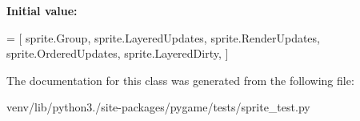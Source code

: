 {\bfseries Initial value\+:}
\begin{DoxyCode}
=  [ sprite.Group,
               sprite.LayeredUpdates,
               sprite.RenderUpdates,
               sprite.OrderedUpdates,
               sprite.LayeredDirty, ]
\end{DoxyCode}


The documentation for this class was generated from the following file\+:\begin{DoxyCompactItemize}
\item 
venv/lib/python3./site-\/packages/pygame/tests/sprite\+\_\+test.\+py\end{DoxyCompactItemize}
